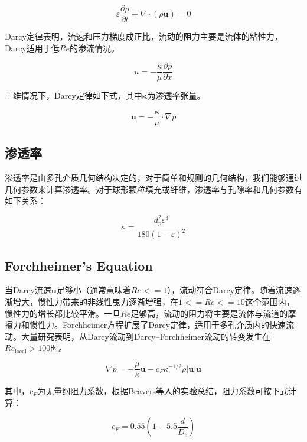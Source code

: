 \begin{equation}
\varepsilon \frac{\partial \rho}{\partial t} + \nabla\cdot(\rho\bm{u}) = 0
\end{equation}

Darcy定律表明，流速和压力梯度成正比，流动的阻力主要是流体的粘性力，Darcy适用于低$ Re $的渗流情况。

\begin{equation}\label{Darcy's-law-2D}
u = -\frac{\kappa}{\mu} \frac{\partial p}{\partial x}
\end{equation}

三维情况下，Darcy定律如下式，其中$ \bm{\kappa} $为渗透率张量。

\begin{equation}\label{Darcy's-law-3D}
\bm{u} = -\frac{\bm{\kappa}}{\mu}\cdot\nabla p
\end{equation}

\subsection{渗透率}

渗透率是由多孔介质几何结构决定的，对于简单和规则的几何结构，我们能够通过几何参数来计算渗透率。对于球形颗粒填充或纤维，渗透率与孔隙率和几何参数有如下关系：

\begin{equation}\label{Carman-Kozeny}
\kappa = \frac{d_p^2\varepsilon^3}{180(1-\varepsilon)^2}
\end{equation}

\subsection{Forchheimer's Equation}
当Darcy流速$ \bm{u} $足够小（通常意味着$ Re<=1 $），流动符合Darcy定律。随着流速逐渐增大，惯性力带来的非线性曳力逐渐增强，在$ 1<=Re<=10 $这个范围内，惯性力的增长都比较平滑。一旦$ Re $足够高，流动的阻力将主要是流体与流道的摩擦力和惯性力。Forchheimer方程扩展了Darcy定律，适用于多孔介质内的快速流动。大量研究表明，从Darcy流动到Darcy–Forchheimer流动的转变发生在$ Re_{\text{local}}>100 $时。

\begin{equation}\label{Forchheimer}
\nabla p = -\frac{\mu}{\kappa}\bm{u} - c_F \kappa^{-1/2}\rho|\bm{u}|\bm{u}
\end{equation}

其中，$ c_F $为无量纲阻力系数，根据Beavers等人的实验总结，阻力系数可按下式计算：

\begin{equation}
c_F = 0.55 \left( 1-5.5\frac{d}{D_e} \right)
\end{equation}

